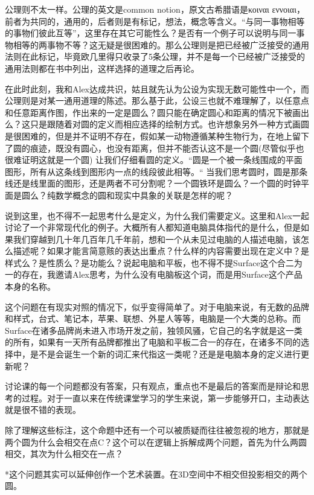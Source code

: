 \documentclass[
]{book}
\begin{document}
公理则不太一样。公理的英文是common notion，原文古希腊语是κοιναι εννοιαι，前者为共同的，通用的，后者则是有标记，想法，概念等含义。``与同一事物相等的事物们彼此互等''，这里存在其它可能性么？是否有一个例子可以说明与同一事物相等的两事物不等？这无疑是很困难的。那么公理则是把已经被广泛接受的通用法则在此标记，毕竟欧几里得只收录了5条公理，并不是每一个已经被广泛接受的通用法则都在书中列出，这样选择的道理之后再论。

在此时此刻，我和Alex达成共识，姑且就先认为公设为实现无数可能性中一个，而公理则是对某一通用道理的陈述。那么基于此，公设三也就不难理解了，以任意点和任意距离作图，作出来的一定是圆么？圆只能在确定圆心和距离的情况下被画出么？这只是跟随着对圆的定义而相应选择的绘制方式。也许想象另外一种方式画圆是很困难的，但是并不证明不存在，假如某一动物遵循某种生物行为，在地上留下了圆的痕迹，既没有圆心，也没有距离，但并不能否认这不是一个圆(尽管似乎也很难证明这就是一个圆)
让我们仔细看圆的定义。``圆是一个被一条线围成的平面图形，所有从这条线到图形内一点的线段彼此相等。`` 当我们思考圆时，圆是那条线还是线里面的图形，还是两者不可分割呢？一个圆铁环是圆么？一个圆的时钟平面是圆么？纯数学概念的圆和现实中具象的关联是怎样的呢？

说到这里，也不得不一起思考什么是定义，为什么我们需要定义。这里和Alex一起讨论了一个非常现代化的例子。大概所有人都知道电脑具体指代的是什么，但是如果我们穿越到几十年几百年几千年前，想和一个从未见过电脑的人描述电脑，该怎么描述呢？如果才能言简意赅的表达出重点？什么样的内容需要出现在定义中？是样式么？是性质么？是功能么？说起电脑和平板，也不得不提Surface这个合二为一的存在，我邀请Alex思考，为什么没有电脑板这个词，而是用Surface这个产品本身的名称。

这个问题在有现实对照的情况下，似乎变得简单了。对于电脑来说，有无数的品牌和样式，台式、笔记本，苹果、联想、外星人等等，电脑是一个大类的总称。而Surface在诸多品牌尚未进入市场开发之前，独领风骚，它自己的名字就是这一类的所有，如果有一天所有品牌都推出了电脑和平板二合一的存在，在诸多不同的选择中，是不是会诞生一个新的词汇来代指这一类呢？还是是电脑本身的定义进行更新呢？

讨论课的每一个问题都没有答案，只有观点，重点也不是最后的答案而是辩论和思考的过程。对于一直以来在传统课堂学习的学生来说，第一步能够开口，主动表达就是很不错的表现。

除了理解这些标注，这个命题中还有一个可以被质疑而往往被忽视的地方，那就是两个圆为什么会相交在点C？这个可以在逻辑上拆解成两个问题，首先为什么两圆相交，其次为什么相交在一点？

*这个问题其实可以延伸创作一个艺术装置。在3D空间中不相交但投影相交的两个圆。
\end{document}
